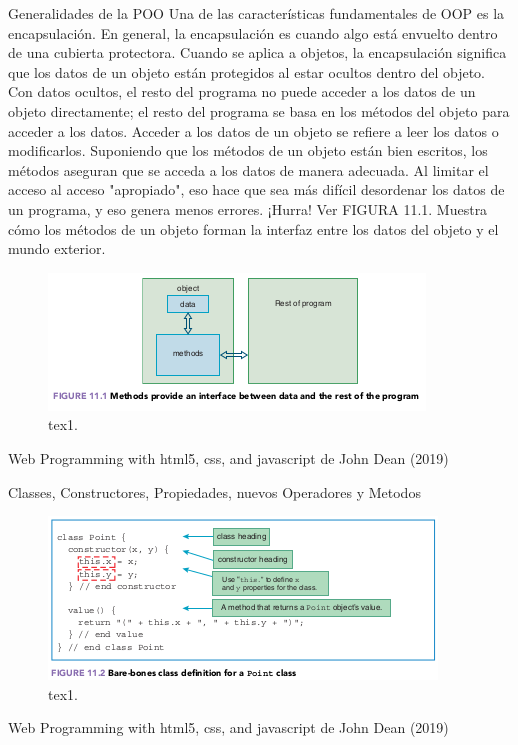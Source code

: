 \begin{frame}{Generalidades de la POO}
\justifying
Una de las características fundamentales de OOP es la encapsulación. En general, la encapsulación es cuando algo está envuelto dentro de una cubierta protectora. Cuando se aplica a objetos, la encapsulación significa que los datos de un objeto están protegidos al estar ocultos dentro del objeto. Con datos ocultos, el resto del programa no puede acceder a los datos de un objeto directamente; el resto del programa se basa en los métodos del objeto para acceder a los datos. Acceder a los datos de un objeto se refiere a leer los datos o modificarlos. Suponiendo que los métodos de un objeto están bien escritos, los métodos aseguran que se acceda a los datos de manera adecuada. Al limitar el acceso al acceso "apropiado", eso hace que sea más difícil desordenar los datos de un programa, y eso genera menos errores. ¡Hurra! Ver FIGURA 11.1. Muestra cómo los métodos de un objeto forman la interfaz entre los datos del objeto
y el mundo exterior.

\begin{figure}
\centering
\includegraphics[scale=0.3]{Section_Files/images/Sec04/01.png}
\caption{tex1.}
\end{figure}

{\tiny Web Programming with html5, css, and javascript de John Dean (2019)}
\end{frame}

\begin{frame}{Classes, Constructores, Propiedades, nuevos
Operadores y Metodos}
\justifying

\begin{figure}
\centering
\includegraphics[scale=0.3]{Section_Files/images/Sec04/02.png}
\caption{tex1.}
\end{figure}

{\tiny Web Programming with html5, css, and javascript de John Dean (2019)}
\end{frame}